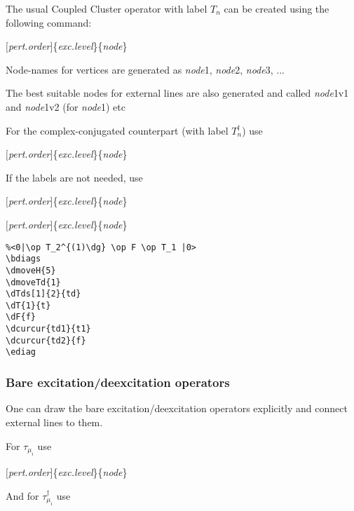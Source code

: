 \documentclass[a4paper]{article}
\newcommand{\myind}{\hspace{10pt}}
\begin{document}
The usual Coupled Cluster operator with label $T_{n}$ can be created using the following command:

\myind{\bf \textbackslash dT}$[${\it pert.order}$]$\{{\it exc.level}\}\{{\it node}\}

Node-names for vertices are generated as {\it node}1, {\it node}2, {\it node}3, ...

The best suitable nodes for external lines are also generated and called {\it node}1v1 and {\it node}1v2 
(for {\it node}1) etc

For the complex-conjugated counterpart (with label $T^{\dagger}_{n}$) use 

\myind{\bf \textbackslash dTd}$[${\it pert.order}$]$\{{\it exc.level}\}\{{\it node}\}

If the labels are not needed, use

\myind{\bf \textbackslash dTs}$[${\it pert.order}$]$\{{\it exc.level}\}\{{\it node}\}

\myind{\bf \textbackslash dTds}$[${\it pert.order}$]$\{{\it exc.level}\}\{{\it node}\}

 \begin{minipage}[b]{0.5\linewidth}\centering
  \begin{lstlisting}
%<0|\op T_2^{(1)\dg} \op F \op T_1 |0>
\bdiags
\dmoveH{5}
\dmoveTd{1}
\dTds[1]{2}{td}
\dT{1}{t}
\dF{f}
\dcurcur{td1}{t1}
\dcurcur{td2}{f}
\ediag
  \end{lstlisting}
 \end{minipage}
 \begin{minipage}[b]{0.5\linewidth}\centering
\bdiags
{}
\ediag
 \end{minipage}

\subsubsection{Bare excitation/deexcitation operators}

One can draw the bare excitation/deexcitation operators explicitly and connect external lines to them.

For $\tau_{\mu_i}$ use

\myind{\bf \textbackslash dTv}$[${\it pert.order}$]$\{{\it exc.level}\}\{{\it node}\}

And for $\tau^{\dagger}_{\mu_i}$ use
\end{document}
